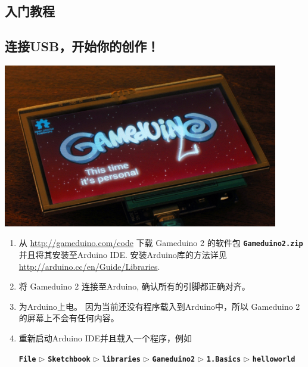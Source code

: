 \documentclass[10pt]{book}
\newcommand{\gdtwo}{Gameduino 2 }
\newcommand{\mach}[1]{\texttt{\textbf{#1}}}
\begin{document}
\begin{CJK}{UTF8}{gkai}
\vfill


\endgroup

\thispagestyle{empty}
\pagestyle{headings}

\tableofcontents

\part{入门教程}

\chapter{连接USB，开始你的创作！}

\begin{center}
\includegraphics[width=0.9\textwidth]{assets/plugin.jpg}
\end{center}

\begin{enumerate}

\item
从 \url{http://gameduino.com/code} 下载 \gdtwo 的软件包 \mach{Gameduino2.zip} 并且将其安装至Arduino IDE.
安装Arduino库的方法详见
\url{http://arduino.cc/en/Guide/Libraries}.

\item
将 \gdtwo 连接至Arduino, 确认所有的引脚都正确对齐。

\item
为Arduino上电。 因为当前还没有程序载入到Arduino中，所以 \gdtwo 的屏幕上不会有任何内容。

\item
重新启动Arduino IDE并且载入一个程序，例如 \\
\begin{small}
\mach{File} $\triangleright$
\mach{Sketchbook} $\triangleright$
\mach{libraries} $\triangleright$
\mach{Gameduino2} $\triangleright$
\mach{1.Basics} $\triangleright$
\mach{helloworld}
\end{small}


\end{enumerate}
\end{CJK}
\end{document}
